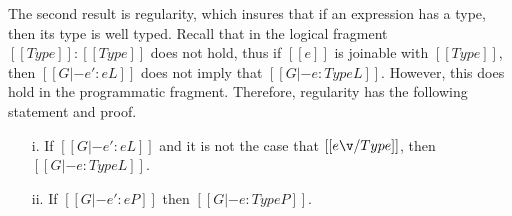 The second result is regularity, which insures that if an expression has a
type, then its type is well typed.  Recall that in the logical
fragment $[[Type]] : [[Type]]$ does not hold, thus if $[[e]]$ is
joinable with $[[Type]]$, then $[[G |- e' : e L]]$ does not imply that
$[[G |- e : Type L]]$.  However, this does hold in the programmatic
fragment.  Therefore, regularity has the following statement and
proof.
\begin{lemma}[Regularity]
  \label{lemma:regularity}
  \begin{itemize}
  \item[i.] If $[[G |- e':e L]]$ and it is not the case that $[[e \v/ Type]]$, then $[[G |- e:Type L]]$.
  \item[ii.] If $[[G |- e':e P]]$ then $[[G |- e:Type P]]$.
  \end{itemize}
\end{lemma}
